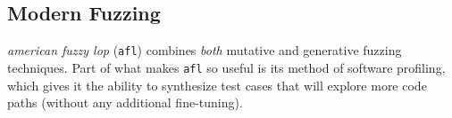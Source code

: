 \subsection{Modern Fuzzing}

\textit{american fuzzy lop}\cite{afl-main} (\texttt{afl})
combines \textit{both} mutative and generative fuzzing techniques.
Part of what makes \texttt{afl} so useful is its method of software profiling, which gives it the ability to synthesize test cases that will explore more code paths (without any additional fine-tuning).
